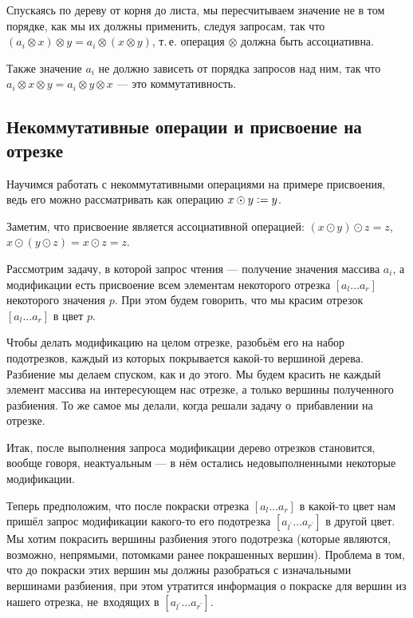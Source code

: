 Спускаясь по дереву от корня до листа, мы пересчитываем значение не в том порядке, как мы их должны применить, следуя запросам, так что $(a_i \otimes x) \otimes y = a_i \otimes (x \otimes y)$, т.\,е. операция $\otimes$ должна быть ассоциативна.

Также значение $a_i$ не должно зависеть от порядка запросов над ним, так что $a_i \otimes x \otimes y = a_i \otimes y \otimes x$ --- это коммутативность.

\subsection{Некоммутативные операции и присвоение на отрезке}

Научимся работать с некоммутативными операциями на примере присвоения, ведь его можно рассматривать как операцию $x \odot y \vcentcolon = y$.

\begin{remark}
    Заметим, что присвоение является ассоциативной операцией: $(x \odot y) \odot z = z$, $x \odot (y \odot z) = x \odot z = z$.
\end{remark}

Рассмотрим задачу, в которой запрос чтения --- получение значения массива $a_i$, а модификации есть присвоение всем элементам некоторого отрезка $[a_l\ldots a_r]$ некоторого значения $p$. При этом будем говорить, что мы красим отрезок $[a_l\ldots a_r]$ в цвет $p$.

Чтобы делать модификацию на целом отрезке, разобьём его на набор подотрезков, каждый из которых покрывается какой-то вершиной \mbox{дерева}. Разбиение мы делаем спуском, как и до этого. Мы будем \mbox{красить} не \mbox{каждый} элемент массива на интересующем нас отрезке, а только \mbox{вершины} полученного разбиения. То же самое мы делали, когда решали задачу о~прибавлении на отрезке.

Итак, после выполнения запроса модификации дерево отрезков становится, вообще говоря, неактуальным --- в нём остались недовыполненными некоторые модификации.

Теперь предположим, что после покраски отрезка $[a_l\ldots a_r]$ в какой-то цвет нам пришёл запрос модификации какого-то его подотрезка $[a_{l^\prime}\ldots a_{r^\prime}]$ в другой цвет. Мы хотим покрасить вершины \mbox{разбиения} \mbox{этого} подотрезка (которые являются, возможно, непрямыми, потомками \mbox{ранее} покрашенных вершин). Проблема в том, что до покраски этих вершин мы должны разобраться с изначальными вершинами разбиения, при этом утратится информация о покраске для вершин из нашего отрезка, не~входящих в $[a_{l^\prime}\ldots a_{r^\prime}]$.

